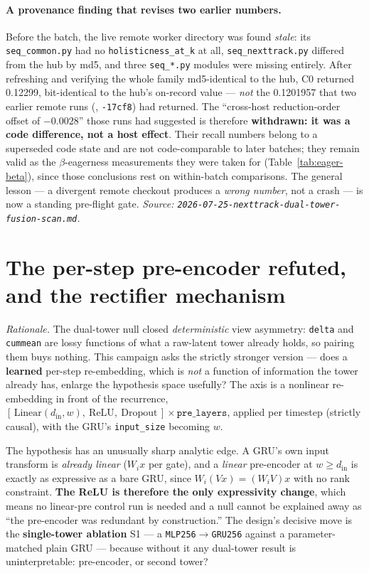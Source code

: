 \documentclass[11pt]{article}
\newcommand{\runid}[1]{\texttt{\small\seqsplit{#1}}}
\begin{document}
\paragraph{A provenance finding that revises two earlier numbers.} Before the
batch, the live remote worker directory was found \emph{stale}: its
\texttt{seq\_common.py} had no \texttt{holisticness\_at\_k} at all,
\texttt{seq\_nexttrack.py} differed from the hub by md5, and three
\texttt{seq\_*.py} modules were missing entirely. After refreshing and verifying
the whole family md5-identical to the hub, C0 returned \num{0.12299},
bit-identical to the hub's on-record value --- \emph{not} the \num{0.1201957}
that two earlier remote runs (\runid{run-20260723-002044-af11a},
\texttt{-17cf8}) had returned. The ``cross-host reduction-order offset of
$-\num{0.0028}$'' those runs had suggested is therefore \textbf{withdrawn: it was
a code difference, not a host effect}. Their recall numbers belong to a
superseded code state and are not code-comparable to later batches; they remain
valid as the $\beta$-eagerness measurements they were taken for
(Table~\ref{tab:eager-beta}), since those conclusions rest on within-batch
comparisons. The general lesson --- a divergent remote checkout produces a
\emph{wrong number}, not a crash --- is now a standing pre-flight gate.
\emph{Source: \texttt{2026-07-25-nexttrack-dual-tower-fusion-scan.md}.}

\section{The per-step pre-encoder refuted, and the rectifier mechanism}
\label{sec:preencoder}
\emph{Rationale.} The dual-tower null closed \emph{deterministic} view
asymmetry: \texttt{delta} and \texttt{cummean} are lossy functions of what a
raw-latent tower already holds, so pairing them buys nothing. This campaign asks
the strictly stronger version --- does a \textbf{learned} per-step
re-embedding, which is \emph{not} a function of information the tower already
has, enlarge the hypothesis space usefully? The axis is a nonlinear
re-embedding in front of the recurrence,
$[\,\text{Linear}(d_{\text{in}},w),\ \text{ReLU},\ \text{Dropout}\,]\times
\texttt{pre\_layers}$, applied per timestep (strictly causal), with the GRU's
\texttt{input\_size} becoming $w$.

The hypothesis has an unusually sharp analytic edge. A GRU's own input transform
is \emph{already linear} ($W_i x$ per gate), and a \emph{linear} pre-encoder at
$w \ge d_{\text{in}}$ is exactly as expressive as a bare GRU, since
$W_i(Vx) = (W_iV)x$ with no rank constraint. \textbf{The ReLU is therefore the
only expressivity change}, which means no linear-pre control run is needed and a
null cannot be explained away as ``the pre-encoder was redundant by
construction.'' The design's decisive move is the \textbf{single-tower ablation}
S1 --- a \texttt{MLP256}$\to$\texttt{GRU256} against a parameter-matched plain
GRU --- because without it any dual-tower result is uninterpretable: pre-encoder,
or second tower?
\end{document}
